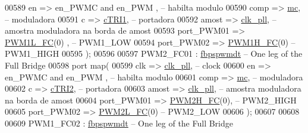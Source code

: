 \begin{DoxyCode}
00589          en => en\_PWMC \textcolor{keywordflow}{and} en\_PWM  ,\textcolor{keyword}{ -- habilta modulo}
00590          comp  => \hyperlink{class_d_e0___n_a_n_o___v_f_1_1_m_a_i_n_add77a3ba2fff852407a90f156620722c}{mc},\textcolor{keyword}{ -- moduladora     }
00591          c => \hyperlink{class_d_e0___n_a_n_o___v_f_1_1_m_a_i_n_acbce87b3c43d76e6a2c55d2e90db56c3}{cTRI1},\textcolor{keyword}{ -- portadora}
00592          amost => \hyperlink{class_d_e0___n_a_n_o___v_f_1_1_m_a_i_n_a1d63ebfc050c1099e1dff991817ec3b0}{clk\_pll},\textcolor{keyword}{ -- amostra moduladora na borda de amost}
00593          port\_PWM01  => \hyperlink{class_d_e0___n_a_n_o___v_f_ac9a5e24e4c9b96a7ee1750285ff2af08}{PWM1L\_FC}\textcolor{vhdlchar}{(}\textcolor{vhdllogic}{0}\textcolor{vhdlchar}{)} ,\textcolor{keyword}{ -- PWM1\_LOW}
00594          port\_PWM02 => \hyperlink{class_d_e0___n_a_n_o___v_f_ae64c7416adbe802e6aa4125230fad012}{PWM1H\_FC}\textcolor{vhdlchar}{(}\textcolor{vhdllogic}{0}\textcolor{vhdlchar}{)}\textcolor{keyword}{   --PWM1\_HIGH}
00595          \textcolor{vhdlchar}{)};  
00596         
00597 PWM2\_FC01 : \hyperlink{classfbpspwmdt}{fbpspwmdt} -- One leg \textcolor{keywordflow}{of} the Full Bridge
00598     \textcolor{keywordflow}{port} \textcolor{keywordflow}{map}( 
00599          clk => \hyperlink{class_d_e0___n_a_n_o___v_f_1_1_m_a_i_n_a1d63ebfc050c1099e1dff991817ec3b0}{clk\_pll},\textcolor{keyword}{ -- clock}
00600          en => en\_PWMC \textcolor{keywordflow}{and} en\_PWM  ,\textcolor{keyword}{ -- habilta modulo}
00601          comp  => \hyperlink{class_d_e0___n_a_n_o___v_f_1_1_m_a_i_n_add77a3ba2fff852407a90f156620722c}{mc},\textcolor{keyword}{ -- moduladora     }
00602          c => \hyperlink{class_d_e0___n_a_n_o___v_f_1_1_m_a_i_n_a0691f44fd4ef0a19b491e285cbb23286}{cTRI2},\textcolor{keyword}{ -- portadora}
00603          amost => \hyperlink{class_d_e0___n_a_n_o___v_f_1_1_m_a_i_n_a1d63ebfc050c1099e1dff991817ec3b0}{clk\_pll},\textcolor{keyword}{ -- amostra moduladora na borda de amost}
00604          port\_PWM01  => \hyperlink{class_d_e0___n_a_n_o___v_f_a8318940c01015b267904bdca0e01c2a2}{PWM2H\_FC}\textcolor{vhdlchar}{(}\textcolor{vhdllogic}{0}\textcolor{vhdlchar}{)},\textcolor{keyword}{ -- PWM2\_HIGH}
00605          port\_PWM02 => \hyperlink{class_d_e0___n_a_n_o___v_f_a47c0de05323647e9484b2ec6764255c0}{PWM2L\_FC}\textcolor{vhdlchar}{(}\textcolor{vhdllogic}{0}\textcolor{vhdlchar}{)}\textcolor{keyword}{   -- PWM2\_LOW}
00606          \textcolor{vhdlchar}{)};         
00607 
00608 
00609 PWM1\_FC02 : \hyperlink{classfbpspwmdt}{fbpspwmdt} -- One leg \textcolor{keywordflow}{of} the Full Bridge

\end{DoxyCode}
